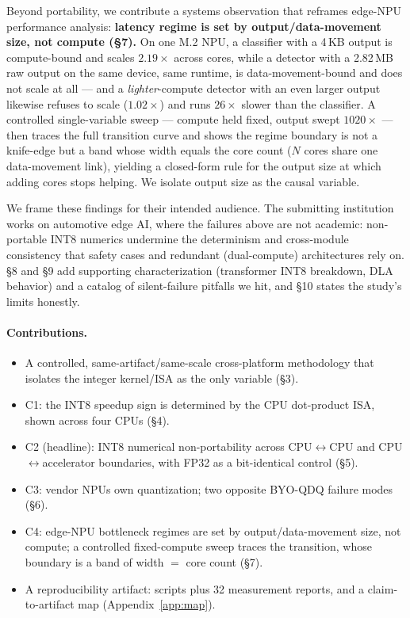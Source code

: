 \documentclass[11pt]{article}
\begin{document}
Beyond portability, we contribute a systems observation that reframes edge-NPU performance analysis: \textbf{latency regime is set by output/data-movement size, not compute (\S7).} On one M.2 NPU, a classifier with a 4\,KB output is compute-bound and scales $2.19\times$ across cores, while a detector with a 2.82\,MB raw output on the same device, same runtime, is data-movement-bound and does not scale at all --- and a \emph{lighter}-compute detector with an even larger output likewise refuses to scale ($1.02\times$) and runs $26\times$ slower than the classifier. A controlled single-variable sweep --- compute held fixed, output swept $1020\times$ --- then traces the full transition curve and shows the regime boundary is not a knife-edge but a band whose width equals the core count ($N$ cores share one data-movement link), yielding a closed-form rule for the output size at which adding cores stops helping. We isolate output size as the causal variable.

We frame these findings for their intended audience. The submitting institution works on automotive edge AI, where the failures above are not academic: non-portable INT8 numerics undermine the determinism and cross-module consistency that safety cases and redundant (dual-compute) architectures rely on. \S8 and \S9 add supporting characterization (transformer INT8 breakdown, DLA behavior) and a catalog of silent-failure pitfalls we hit, and \S10 states the study's limits honestly.

\paragraph{Contributions.}
\begin{itemize}
\item A controlled, same-artifact/same-scale cross-platform methodology that isolates the integer kernel/ISA as the only variable (\S3).
\item C1: the INT8 speedup sign is determined by the CPU dot-product ISA, shown across four CPUs (\S4).
\item C2 (headline): INT8 numerical non-portability across CPU$\leftrightarrow$CPU and CPU$\leftrightarrow$accelerator boundaries, with FP32 as a bit-identical control (\S5).
\item C3: vendor NPUs own quantization; two opposite BYO-QDQ failure modes (\S6).
\item C4: edge-NPU bottleneck regimes are set by output/data-movement size, not compute; a controlled fixed-compute sweep traces the transition, whose boundary is a band of width $=$ core count (\S7).
\item A reproducibility artifact: scripts plus 32 measurement reports, and a claim-to-artifact map (Appendix~\ref{app:map}).
\end{itemize}
\end{document}
